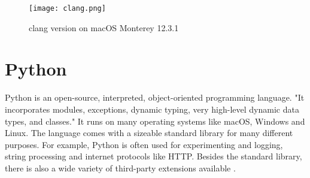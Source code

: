 \begin{figure}[htbp]
	\centering
	\texttt{[image: clang.png]}
	\caption{clang version on macOS Monterey 12.3.1}
	\label{figure:clang}
\end{figure}

\section{Python}
Python is an open-source, interpreted, object-oriented programming language. "It incorporates modules, exceptions, dynamic typing, very high-level dynamic data types, and classes." It runs on many operating systems like macOS, Windows and Linux.
The language comes with a sizeable standard library for many different purposes. For example, Python is often used for experimenting and logging, string processing and internet protocols like HTTP. Besides the standard library, there is also a wide variety of third-party extensions available \cite{python}.
